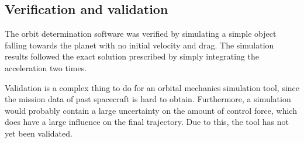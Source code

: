 \subsection{Verification and validation}
The orbit determination software was verified by simulating a simple object falling towards the planet with no initial velocity and drag. The simulation results followed the exact solution prescribed by simply integrating the acceleration two times.

Validation is a complex thing to do for an orbital mechanics simulation tool, since the mission data of past spacecraft is hard to obtain. Furthermore, a simulation would probably contain a large uncertainty on the amount of control force, which does have a large influence on the final trajectory. Due to this, the tool has not yet been validated.

